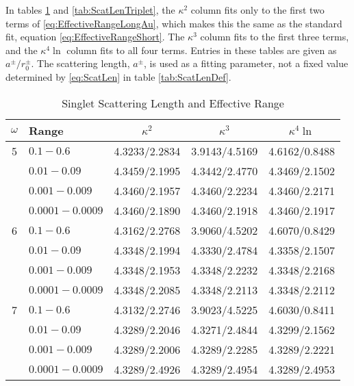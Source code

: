 \documentclass[Dissertation.tex]{subfiles}
\begin{document}
In tables \ref{tab:ScatLenSinglet} and \ref{tab:ScatLenTriplet}, the $\kappa^2$ column fits only to the first two terms of \ref{eq:EffectiveRangeLongAu}, which makes this the same as the standard fit, equation \ref{eq:EffectiveRangeShort}.  The $\kappa^3$ column fits to the first three terms, and the $\kappa^4 \ln$ column fits to all four terms.  Entries in these tables are given as $a^\pm / r_0^\pm$. The scattering length, $a^\pm$, is used as a fitting parameter, not a fixed value determined by \ref{eq:ScatLen} in table \ref{tab:ScatLenDef}.


\begin{table}[H]
\centering
\begin{tabular}{c l c c c}
\toprule
$\omega$ & Range & $\kappa^2$ & $\kappa^3$ & $\kappa^4 \ln$ \\
\midrule
5 & $0.1 - 0.6$ & 4.3233/2.2834 & 3.9143/4.5169 & 4.6162/0.8488 \\
  & $0.01 - 0.09$ & 4.3459/2.1995 & 4.3442/2.4770 & 4.3469/2.1502 \\
  & $0.001 - 0.009$ & 4.3460/2.1957 & 4.3460/2.2234 & 4.3460/2.2171 \\
  & $0.0001 - 0.0009$ & 4.3460/2.1890 & 4.3460/2.1918 & 4.3460/2.1917 \\
\midrule
6 & $0.1 - 0.6$ & 4.3162/2.2768 & 3.9060/4.5202 & 4.6070/0.8429 \\
  & $0.01 - 0.09$ & 4.3348/2.1994 & 4.3330/2.4784 & 4.3358/2.1507 \\
  & $0.001 - 0.009$ & 4.3348/2.1953 & 4.3348/2.2232 & 4.3348/2.2168 \\
  & $0.0001 - 0.0009$ & 4.3348/2.2085 & 4.3348/2.2113 & 4.3348/2.2112 \\
\midrule
7 & $0.1 - 0.6$ & 4.3132/2.2746 & 3.9023/4.5225 & 4.6030/0.8411 \\
  & $0.01 - 0.09$ & 4.3289/2.2046 & 4.3271/2.4844 & 4.3299/2.1562 \\
  & $0.001 - 0.009$ & 4.3289/2.2006 & 4.3289/2.2285 & 4.3289/2.2221 \\
  & $0.0001 - 0.0009$ & 4.3289/2.4926 & 4.3289/2.4954 & 4.3289/2.4953 \\
\bottomrule
\end{tabular}
\caption{Singlet Scattering Length and Effective Range}
\label{tab:ScatLenSinglet}
\end{table}
\end{document}
